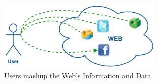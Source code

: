 \begin{figure}[!ht]
  \centering
  \includegraphics[width=0.7\textwidth]{figures/UsersWeildServicesInTheWeb}
  \caption{Users mashup the Web's Information and Data}
  \label{fig:UsersWeildServicesInTheWeb}
\end{figure}


